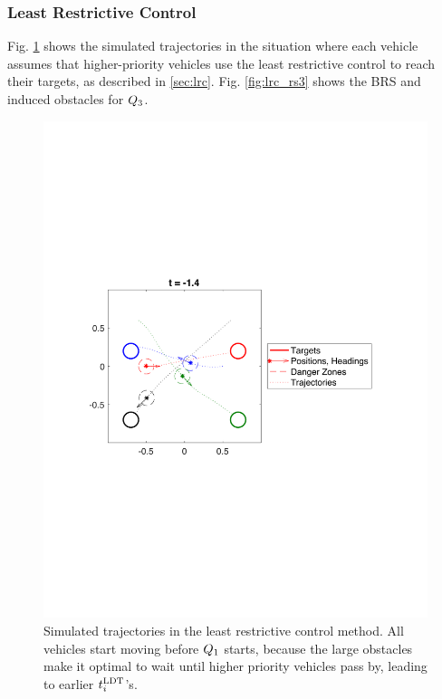 \subsubsection{Least Restrictive Control}
Fig. \ref{fig:lrc_traj} shows the simulated trajectories in the situation where each vehicle assumes that higher-priority vehicles use the least restrictive control to reach their targets, as described in \ref{sec:lrc}. Fig. \ref{fig:lrc_rs3} shows the BRS and induced obstacles for $Q_3$.

\begin{figure}[H]
  \centering
  \includegraphics[width=\columnwidth]{"fig/lrc_traj"}
  \caption{Simulated trajectories in the least restrictive control method. All vehicles start moving before $Q_1$ starts, because the large obstacles make it optimal to wait until higher priority vehicles pass by, leading to earlier $t^\text{LDT}_i$'s. }
  \label{fig:lrc_traj}
\end{figure}

